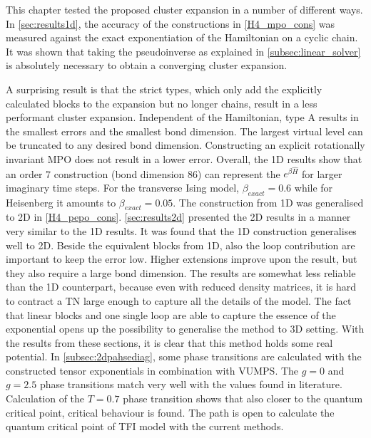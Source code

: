 This chapter tested the proposed cluster expansion in a number of different ways. In \cref{sec:results1d}, the accuracy of the constructions in \cref{H4_mpo_cons} was measured against the exact exponentiation of the Hamiltonian on a cyclic chain. It was shown that taking the pseudoinverse as explained in \cref{subsec:linear_solver} is absolutely necessary to obtain a converging cluster expansion.

A surprising result is that the strict types, which only add the explicitly calculated blocks to the expansion but no longer chains, result in a less performant cluster expansion. Independent of the Hamiltonian, type A results in the smallest errors and the smallest bond dimension. The largest virtual level can be truncated to any desired bond dimension. Constructing an explicit rotationally invariant \Gls{MPO} does not result in a lower error.
Overall, the 1D results show that an order 7 construction (bond dimension 86) can represent the $e^{\beta \hat{H}}$ for larger imaginary time steps. For the transverse Ising model, $\beta_{exact} = 0.6$ while for Heisenberg it amounts to $\beta_{exact} = 0.05$.
The construction from 1D was generalised to 2D in \cref{H4_pepo_cons}. \cref{sec:results2d} presented the 2D results in a manner very similar to the 1D results. It was found that the 1D construction generalises well to 2D. Beside the equivalent blocks from 1D, also the loop contribution are important to keep the error low. Higher extensions improve upon the result, but they also require a large bond dimension. The results are somewhat less reliable than the 1D counterpart, because even with reduced density matrices, it is hard to contract a \Gls{TN} large enough to capture all the details of the model.
The fact that linear blocks and one single loop are able to capture the essence of the exponential opens up the possibility to generalise the method to 3D setting.
With the results from these sections, it is clear that this method holds some real potential. In \cref{subsec:2dpahsediag}, some phase transitions are calculated with the constructed tensor exponentials in combination with \Gls{VUMPS}. The $g=0$ and $g=2.5$ phase transitions match very well with the values found in literature. Calculation of the $T=0.7$ phase transition shows that also closer to the quantum critical point, critical behaviour is found.
The path is open to calculate the quantum critical point of \Gls{TFI} model with the current methods.
